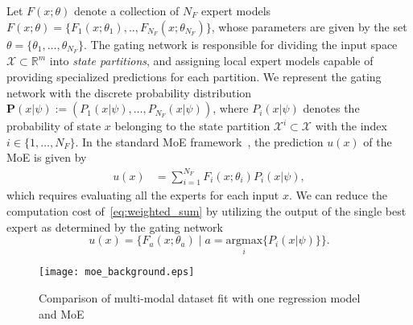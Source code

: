 Let $F(x; \theta)$ denote a collection of $N_F$ expert models $F(x;\theta) =
\{F_1(x; \theta_1), .. , F_{N_{F}}(x; \theta_{N_F})\}$, whose parameters
are given by the set $\theta=\{\theta_1, \dots, \theta_{N_{F}} \}$.
%
The gating network is responsible for dividing the input space $\mathcal{X}
\subset \mathbb{R}^m$ into \textit{state partitions}, and assigning local expert
models capable of providing specialized predictions for each partition.
%
%
We represent the gating network with the discrete probability distribution
$\mathbf{P}(x| \psi) := (P_1(x| \psi), \dots, P_{N_F}(x| \psi))$, where $P_i(x |
\psi)$ denotes the probability of state $x$ belonging to the state partition
$\mathcal{X}^i \subset \mathcal{X}$ with the index $i \in \{1, \dots, N_F \}$. 
%
%
%
In the standard MoE framework~\cite{jordan1994hierarchical}, the prediction
$u(x)$ of the MoE is given by
\begin{align}
  u(x) &= \sum_{i=1}^{N_F}F_i(x; \theta_i)P_i(x | \psi),
  \label{eq:weighted_sum}
\end{align}
%
which requires evaluating all the experts for each input $x$.
%
We can reduce the computation cost of~\eqref{eq:weighted_sum} by utilizing the
output of the single best expert as determined by the gating
network\cite{chen2022towards}
\begin{equation}
    u(x) = \{ F_a(x; \theta_a) \; | \; a = \underset{i}{\textrm{argmax}} \{ P_i(x | \psi) \} \}.
  \label{eq:best_expert_prediction}
\end{equation}
%
\begin{figure}[tb]
  \centering
  \texttt{[image: moe\_background.eps]}
   \caption{Comparison of multi-modal dataset
  fit with one regression model and MoE }{\hspace{0.5\linewidth}}
  \label{fig:oldfaithful}
\end{figure}

